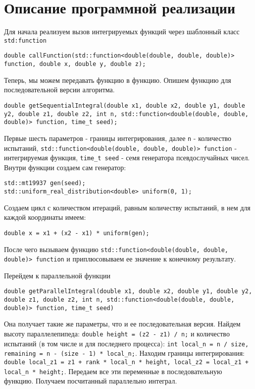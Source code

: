 \documentclass{report}
\begin{document}
\section*{Описание программной реализации}
Для начала реализуем вызов интегрируемых функций через шаблонный класс \lstinline$std:function$
\begin{lstlisting}
double callFunction(std::function<double(double, double, double)> function, double x, double y, double z);
\end{lstlisting}
\par Теперь, мы можем передавать функцию в функцию. Опишем функцию для последовательной версии алгоритма.
\begin{lstlisting}
double getSequentialIntegral(double x1, double x2, double y1, double y2, double z1, double z2, int n, std::function<double(double, double, double)> function, time_t seed);
\end{lstlisting}
Первые шесть параметров - границы интегрирования, далее \lstinline$n$ - количество испытаний, \lstinline$std::function<double(double, double, double)> function$ - интегрируемая функция, \lstinline$time_t seed$ - семя генератора псевдослучайных чисел.
Внутри функции создаем сам генератор:
\begin{lstlisting}
std::mt19937 gen(seed);
std::uniform_real_distribution<double> uniform(0, 1);
\end{lstlisting}
Создаем цикл с количеством итераций, равным количеству испытаний, в нем для каждой координаты имеем:
\begin{lstlisting}
double x = x1 + (x2 - x1) * uniform(gen);
\end{lstlisting}
После чего вызываем функцию \lstinline$std::function<double(double, double, double)> function$ и приплюсовываем ее значение к конечному результату.
\par Перейдем к параллельной функции
\begin{lstlisting}
double getParallelIntegral(double x1, double x2, double y1, double y2, double z1, double z2, int n, std::function<double(double, double, double)> function, time_t seed) 
\end{lstlisting}
Она получает такие же параметры, что и ее последовательная версия. Найдем высоту параллелепипеда: \lstinline$double height = (z2 - z1) / n;$ и количество испытаний (в том числе и для последнего процесса): \lstinline$int local_n = n / size, remaining = n - (size - 1) * local_n;$.
Находим границы интегрирования:  \lstinline$double local_z1 = z1 + rank * local_n * height, local_z2 = local_z1 + local_n * height;$. Передаем все эти переменные в последовательную функцию. Получаем посчитанный параллельно интеграл.
\newpage
\end{document}
